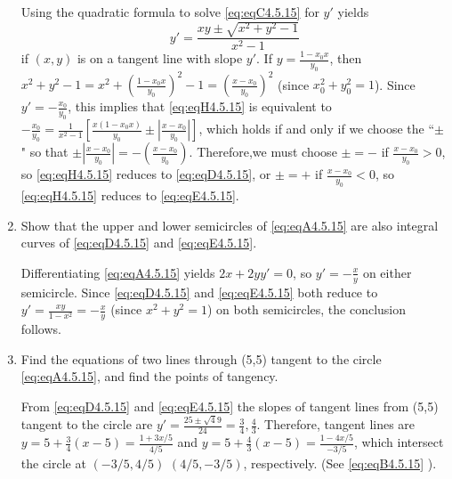 \documentclass{ximera}
\begin{document}
\begin{problem}
\begin{enumerate}
\begin{solution}
Using the quadratic formula to solve \ref{eq:eqC4.5.15} for $y'$
yields
\begin{equation}\label{eq:eqH4.5.16}
y'=\frac{xy\pm\sqrt{x^2+y^2-1}}{x^2-1}
\end{equation}
if $(x,y)$ is on a tangent  line with slope $y'$.
If $y=\frac{1-x_0x}{y_0}$, then
$x^2+y^2-1=x^2+\left(\frac{1-x_0x}{y_0}\right)^2-1=\left(\frac{x-x_0}{y_0}\right)^2$
(since $x_0^2+y_0^2=1$). Since $y'=-\frac{x_0}{y_0}$, this implies
that \ref{eq:eqH4.5.15} is equivalent to
$-\frac{x_0}{y_0}=\frac{1}{x^2-1}\left[\frac{x(1-x_0x)}{y_0}
\pm\left|\frac{x-x_0}{y_0}\right|\right]$,
which holds if and only if we choose the ``$\pm$" so that
 $\pm\left|\frac{x-x_0}{y_0}\right|=-\left(\frac{x-x_0}{y_0}\right)$.  Therefore,we must choose $\pm=-$ if $\frac{x-x_0}{y_0}>0$, so \ref{eq:eqH4.5.15} reduces to \ref{eq:eqD4.5.15},
or  $\pm=+$ if $\frac{x-x_0}{y_0}<0$, so \ref{eq:eqH4.5.15} reduces to \ref{eq:eqE4.5.15}.
\end{solution}

\item %
Show that the upper and lower semicircles of \ref{eq:eqA4.5.15} are also integral
curves of \ref{eq:eqD4.5.15} and \ref{eq:eqE4.5.15}.

\begin{solution}
Differentiating \ref{eq:eqA4.5.15}
yields $2x+2yy'=0$, so $y'=-\frac{x}{y}$ on either semicircle.
Since \ref{eq:eqD4.5.15} and \ref{eq:eqE4.5.15} both reduce to $y'=\frac{xy}{1-x^2}=-\frac{x}{y
}$ (since $x^2+y^2=1$) on both semicircles, the conclusion follows.
\end{solution}

\item %
Find the equations of two lines through (5,5) tangent to the circle
\ref{eq:eqA4.5.15}, and find the points of tangency.

\begin{solution}
From \ref{eq:eqD4.5.15} and \ref{eq:eqE4.5.15} the slopes of tangent lines from (5,5)
tangent to the circle are
$y'=\frac{25\pm\sqrt49}{24}=\frac{3}{4},\frac{4}{3}$. Therefore,
tangent lines are $y=5+\frac{3}{4}(x-5)=\frac{1+3x/5}{4/5}$ and
$y=5+\frac{4}{3}(x-5)=\frac{1-4x/5}{-3/5}$, which intersect the
circle at $(-3/5,4/5)$ $(4/5,-3/5)$, respectively. (See \ref{eq:eqB4.5.15} ).
\end{solution}
\end{enumerate}
\end{problem}
\end{document}
